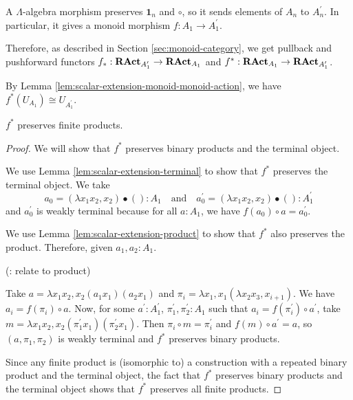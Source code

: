 \begin{definition}
  A $ \Lambda $-algebra morphism preserves $ \mathbf 1_n $ and $ \circ $, so it sends elements of $ A_n $ to $ A^\prime_n $. In particular, it gives a monoid morphism $ f: A_1 \to A^\prime_1 $.

  Therefore, as described in Section \ref{sec:monoid-category}, we get pullback and pushforward functors $ f_*: \mathbf{RAct}_{A^\prime_1} \to \mathbf{RAct}_{A_1} $ and $ f^* : \mathbf{RAct}_{A_1} \to \mathbf{RAct}_{A^\prime_1} $.
\end{definition}

\begin{remark}
  By Lemma \ref{lem:scalar-extension-monoid-monoid-action}, we have $ f^*(U_{A_1}) \cong U_{A^\prime_1} $.
\end{remark}

\begin{lemma}
  $ f^* $ preserves finite products.
\end{lemma}
\begin{proof}
  We will show that $ f^* $ preserves binary products and the terminal object.

  We use Lemma \ref{lem:scalar-extension-terminal} to show that $ f^* $ preserves the terminal object. We take
  \[ a_0 = (\lambda x_1 x_2, x_2) \bullet () : A_1 \quad \text{and} \quad a_0^\prime = (\lambda x_1 x_2, x_2) \bullet () : A^\prime_1 \]
  and $ a_0^\prime $ is weakly terminal because for all $ a : A_1 $, we have $ f(a_0) \circ a = a_0^\prime $.

  We use Lemma \ref{lem:scalar-extension-product} to show that $ f^* $ also preserves the product. Therefore, given $ a_1, a_2 : A_1 $.

  (\TODO: relate to product)

  Take $ a = \lambda x_1 x_2, x_2 (a_1 x_1) (a_2 x_1) $ and $ \pi_i = \lambda x_1, x_1 (\lambda x_2 x_3, x_{i + 1}) $. We have $ a_i = f(\pi_i) \circ a $. Now, for some $ a^\prime: A^\prime_1 $, $ \pi_1^\prime, \pi_2^\prime: A_1 $ such that $ a_i = f(\pi_i^\prime) \circ a^\prime $, take $ m = \lambda x_1 x_2, x_2 (\pi_1^\prime x_1) (\pi_2^\prime x_1) $. Then $ \pi_i \circ m = \pi_i^\prime $ and $ f(m) \circ a^\prime = a $, so $ (a, \pi_1, \pi_2) $ is weakly terminal and $ f^* $ preserves binary products.

  Since any finite product is (isomorphic to) a construction with a repeated binary product and the terminal object, the fact that $ f^* $ preserves binary products and the terminal object shows that $ f^* $ preserves all finite products.
\end{proof}

